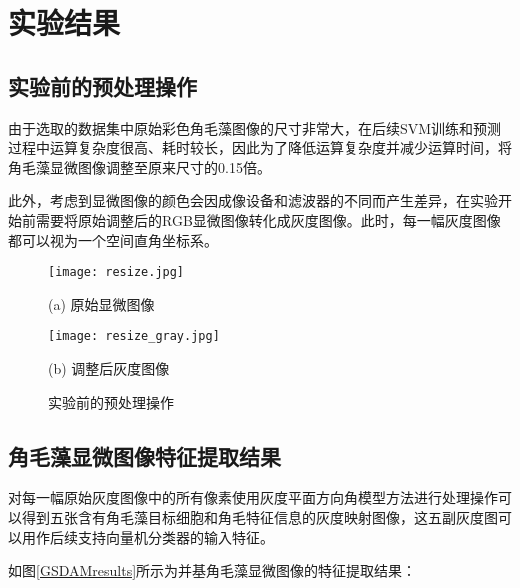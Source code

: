 \section{实验结果}
\subsection{实验前的预处理操作}
由于选取的数据集中原始彩色角毛藻图像的尺寸非常大，在后续SVM训练和预测过程中运算复杂度很高、耗时较长，因此为了降低运算复杂度并减少运算时间，将角毛藻显微图像调整至原来尺寸的0.15倍。

此外，考虑到显微图像的颜色会因成像设备和滤波器的不同而产生差异，在实验开始前需要将原始调整后的RGB显微图像转化成灰度图像。此时，每一幅灰度图像都可以视为一个空间直角坐标系。
\begin{figure}[ht!]
\centering
\begin{minipage}[b]{0.45\linewidth} 
      \centering 
      \texttt{[image: resize.jpg]}
        \centerline{(a) 原始显微图像}\medskip
\end{minipage}
  \begin{minipage}[b]{0.45\linewidth}
    \centering
    \texttt{[image: resize\_gray.jpg]}
      \centerline{(b) 调整后灰度图像}\medskip
  \end{minipage}
 \caption{实验前的预处理操作}
\end{figure}

\subsection{角毛藻显微图像特征提取结果}
对每一幅原始灰度图像中的所有像素使用灰度平面方向角模型方法进行处理操作可以得到五张含有角毛藻目标细胞和角毛特征信息的灰度映射图像，这五副灰度图可以用作后续支持向量机分类器的输入特征。

如图\ref{GSDAMresults}所示为并基角毛藻显微图像的特征提取结果：

